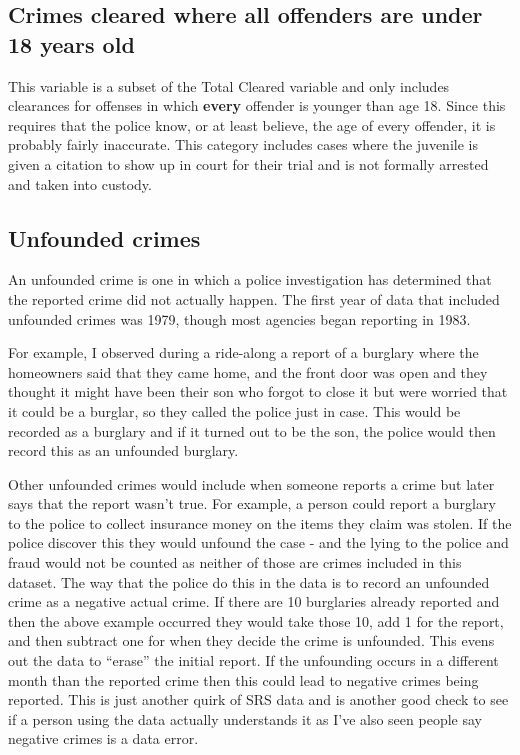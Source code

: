 \documentclass[
]{krantz}
\begin{document}
\subsection{Crimes cleared where all offenders are under 18
years
old}\label{crimes-cleared-where-all-offenders-are-under-18-years-old}

This variable is a subset of the Total Cleared variable and
only includes clearances for offenses in which
\textbf{every} offender is younger than age 18. Since this
requires that the police know, or at least believe, the age
of every offender, it is probably fairly inaccurate. This
category includes cases where the juvenile is given a
citation to show up in court for their trial and is not
formally arrested and taken into custody.

\subsection{Unfounded crimes}\label{unfounded}

An unfounded crime is one in which a police investigation
has determined that the reported crime did not actually
happen. The first year of data that included unfounded
crimes was 1979, though most agencies began reporting in
1983.

For example, I observed during a ride-along a report of a
burglary where the homeowners said that they came home, and
the front door was open and they thought it might have been
their son who forgot to close it but were worried that it
could be a burglar, so they called the police just in case.
This would be recorded as a burglary and if it turned out to
be the son, the police would then record this as an
unfounded burglary.

Other unfounded crimes would include when someone reports a
crime but later says that the report wasn't true. For
example, a person could report a burglary to the police to
collect insurance money on the items they claim was stolen.
If the police discover this they would unfound the case -
and the lying to the police and fraud would not be counted
as neither of those are crimes included in this dataset. The
way that the police do this in the data is to record an
unfounded crime as a negative actual crime. If there are 10
burglaries already reported and then the above example
occurred they would take those 10, add 1 for the report, and
then subtract one for when they decide the crime is
unfounded. This evens out the data to ``erase'' the initial
report. If the unfounding occurs in a different month than
the reported crime then this could lead to negative crimes
being reported. This is just another quirk of SRS data and
is another good check to see if a person using the data
actually understands it as I've also seen people say
negative crimes is a data error.
\end{document}
